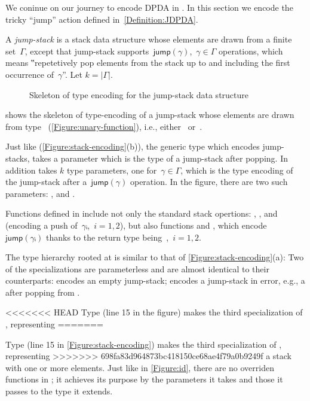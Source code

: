 We coninue on our journey to encode DPDA in \Java.
In this section we encode the tricky ``jump'' action defined in~\cref{Definition:JDPDA}.

A \emph{jump-stack} is a stack data structure whose elements are drawn from a finite set~$Γ$,
  except that jump-stack supports~$\textsf{jump}(γ)$,~$γ∈Γ$ operations,
    which means
  ‟repetetively pop elements from the stack up to and including the first occurrence of~$γ$”.
Let $k=|\Gamma|$. 

\begin{wrapfigure}[16]{r}{42ex}
  \caption{Skeleton of type encoding for the jump-stack data structure}%
  \label{Figure:jump}%
  \lstset{style=numbered}
\end{wrapfigure}

 shows the skeleton of type-encoding of a jump-stack whose
elements are drawn from type~
(\cref{Figure:unary-function}), i.e., either~ or~.

Just like  (\cref{Figure:stack-encoding}(b)),
  the generic type  which encodes jump-stacks, takes
  a  parameter which is the type of a jump-stack after popping.
In addition  takes $k$ type parameters, one for~$γ∈Γ$,
  which is the type encoding of the jump-stack after a~$\textsf{jump}(γ)$
  operation.
In the figure, there are two such parameters: , and
  .

Functions defined in  include not only the standard stack opertions: ,
,  and~ (encoding a push of~$γᵢ$,~$i=1,2$),
  but also functions  and ,
  which encode~$\textsf{jump}(γᵢ)$
  thanks to the return type being~,~$i=1,2$.

The type hierarchy rooted at  is similar to that of
\cref{Figure:stack-encoding}(a):
  Two of the specializations are parameterless and are
  almost identical to their 
  counterparts:
 encodes an empty jump-stack;  encodes a jump-stack in error,
e.g., a after popping from .


<<<<<<< HEAD
Type  (line 15 in the figure) makes  the third specialization of , representing 
=======

Type  (line 15 in \cref{Figure:stack-encoding}) makes  the third specialization of , representing 
>>>>>>> 698fa83d964873bc418150ce68ae4f79a0b9249f
  a stack with one or more elements.
Just like in \cref{Figure:id}, there are no overriden functions in ; it achieves
  its purpose by the parameters it takes and those it passes
  to the type it extends.

